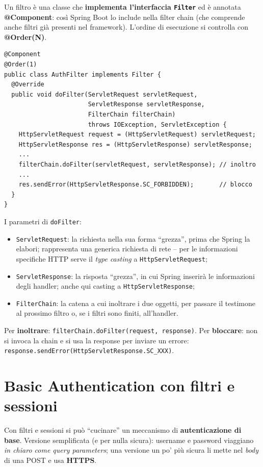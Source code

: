 Un filtro \`e una classe che \textbf{implementa l'interfaccia \texttt{Filter}} ed \`e
annotata \textbf{@Component}: cos\`i Spring Boot lo include nella filter chain (che
comprende anche filtri gi\`a presenti nel framework). L'ordine di esecuzione si controlla
con \textbf{@Order(N)}.
\begin{lstlisting}[style=java]
@Component
@Order(1)
public class AuthFilter implements Filter {
  @Override
  public void doFilter(ServletRequest servletRequest,
                       ServletResponse servletResponse,
                       FilterChain filterChain)
                       throws IOException, ServletException {
    HttpServletRequest request = (HttpServletRequest) servletRequest;
    HttpServletResponse res = (HttpServletResponse) servletResponse;
    ...
    filterChain.doFilter(servletRequest, servletResponse); // inoltro
    ...
    res.sendError(HttpServletResponse.SC_FORBIDDEN);       // blocco
  }
}
\end{lstlisting}
I parametri di \texttt{doFilter}:
\begin{itemize}
  \item \texttt{ServletRequest}: la richiesta nella sua forma ``grezza'', prima che Spring la
        elabori; rappresenta una generica richiesta di rete -- per le informazioni specifiche
        HTTP serve il \emph{type casting} a \texttt{HttpServletRequest};
  \item \texttt{ServletResponse}: la risposta ``grezza'', in cui Spring inserir\`a le
        informazioni degli handler; anche qui casting a \texttt{HttpServletResponse};
  \item \texttt{FilterChain}: la catena a cui inoltrare i due oggetti, per passare il
        testimone al prossimo filtro o, se i filtri sono finiti, all'handler.
\end{itemize}
Per \textbf{inoltrare}: \texttt{filterChain.doFilter(request, response)}. Per
\textbf{bloccare}: non si invoca la chain e si usa la response per inviare un errore:
\texttt{response.sendError(HttpServletResponse.SC\_XXX)}.

\section{Basic Authentication con filtri e sessioni}

Con filtri e sessioni si pu\`o ``cucinare'' un meccanismo di \textbf{autenticazione di
base}. Versione semplificata (e per nulla sicura): username e password viaggiano \emph{in
chiaro come query parameters}; una versione un po' pi\`u sicura li mette nel \emph{body} di
una POST e usa \textbf{HTTPS}.

